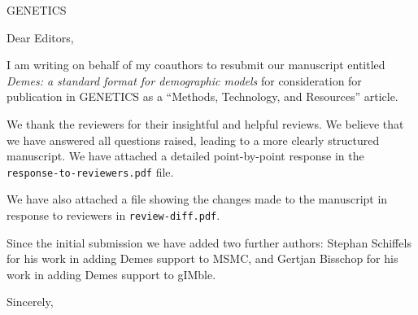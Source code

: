 \documentclass{letter}
\begin{document}
\begin{letter}{GENETICS}

\opening{Dear Editors,}

I am writing on behalf of my coauthors to resubmit our manuscript entitled
\emph{Demes: a standard format for demographic models}
for consideration for publication in GENETICS
as a ``Methods, Technology, and Resources'' article.

We thank the reviewers for their insightful and helpful reviews. We
believe that we have answered all questions raised, leading to a more
clearly structured manuscript. We have attached
a detailed point-by-point response in the \texttt{response-to-reviewers.pdf}
file.

We have also attached a file showing the changes made to the manuscript
in response to reviewers in \texttt{review-diff.pdf}.

Since the initial submission we have added two further authors:
Stephan Schiffels
for his work in adding Demes support
to MSMC, and Gertjan Bisschop for his work in adding
Demes support to gIMble.

\closing{Sincerely,}

\end{letter}
\end{document}
